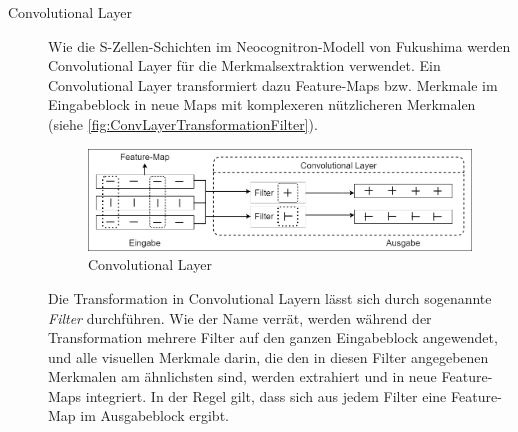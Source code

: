 \begin{description}
	\item[Convolutional Layer] Wie die S-Zellen-Schichten im Neocognitron-Modell von Fukushima werden Convolutional Layer für die Merkmalsextraktion verwendet. Ein Convolutional Layer transformiert dazu Feature-Maps bzw. Merkmale im Eingabeblock in neue Maps mit komplexeren nützlicheren Merkmalen (siehe \autoref{fig:ConvLayerTransformationFilter}).
	

	\begin{figure}[h]
		\centering
		\includegraphics[width=\linewidth]{images/ConvLayerTransformationFilter}
		\caption{Convolutional Layer}
		\label{fig:ConvLayerTransformationFilter}
	\end{figure}
	
	Die Transformation in Convolutional Layern lässt sich durch sogenannte \emph{Filter} durchführen. Wie der Name verrät, werden während der Transformation mehrere Filter auf den ganzen Eingabeblock angewendet, und alle visuellen Merkmale darin, die den in diesen Filter angegebenen Merkmalen am ähnlichsten sind, werden extrahiert und in neue Feature-Maps integriert. In der Regel gilt, dass sich aus jedem Filter eine Feature-Map im Ausgabeblock ergibt. 
	

\end{description}
